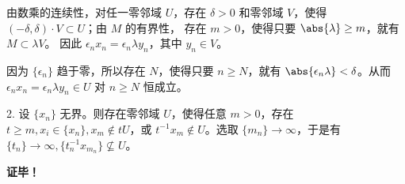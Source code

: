 由数乘的连续性，对任一零邻域 $U$，存在 $\delta>0$ 和零邻域 $V$，使得 $(-\delta,\delta)\cdot V\subset U$；由 $M$ 的有界性， 存在 $m>0$，使得只要 $\abs{\lambda}\geq m$，就有 $M\subset\lambda V$。 因此 $\epsilon_nx_n=\epsilon_n \lambda y_n$，其中 $y_n\in V$。

因为 $\{\epsilon_n\}$ 趋于零，所以存在 $N$，使得只要 $n\geq N$，就有 $\abs{\epsilon_n\lambda}<\delta$。从而 $\epsilon_nx_n=\epsilon_n \lambda y_n\in U$ 对 $n\geq N$ 恒成立。


2. 设 $\{x_n\}$ 无界。则存在零邻域 $U$，使得任意 $m>0$，存在 $t\geq m,x_i\in\{x_n\},x_{m}\notin tU$，或 $t^{-1}x_m\notin U$。选取 $\{m_n\}\rightarrow\infty$，于是有 $\{t_n\}\rightarrow\infty,\{t_n^{-1}x_{m_n}\}\nsubseteq U$。


\textbf{证毕！}











